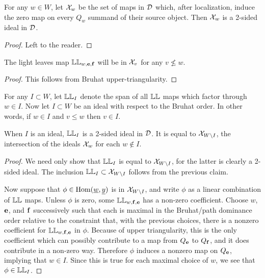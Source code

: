 \begin{claim} For any $w \in W$, let ${\mathcal{X}}_w$ be the set of maps in ${\mathcal{D}}$ which, after localization, induce the zero map on every $Q_w$ summand of their source object. Then ${\mathcal{X}}_w$ is a
2-sided ideal in ${\mathcal{D}}$. \end{claim}

\begin{proof} Left to the reader. \end{proof}

\begin{claim} The light leaves map $\mathbb{LL}_{w,{\mathbf e},{\mathbf f}}$ will be in ${\mathcal{X}}_v$ for any $v \nleq w$. \end{claim}

\begin{proof} This follows from Bruhat upper-triangularity. \end{proof}

For any $I \subset W$, let $\mathbb{LL}_I$ denote the span of all $\mathbb{LL}$ maps which factor through $w \in I$. Now let $I \subset W$ be an ideal with respect to the Bruhat order. In other words,
if $w \in I$ and $v \le w$ then $v \in I$.

\begin{claim} When $I$ is an ideal, $\mathbb{LL}_I$ is a 2-sided ideal in ${\mathcal{D}}$. It is equal to ${\mathcal{X}}_{W \setminus I}$, the intersection of the ideals ${\mathcal{X}}_w$ for each $w \notin I$. \end{claim}

\begin{proof} We need only show that $\mathbb{LL}_I$ is equal to ${\mathcal{X}}_{W \setminus I}$, for the latter is clearly a 2-sided ideal. The inclusion $\mathbb{LL}_I \subset {\mathcal{X}}_{W \setminus I}$ follows from
the previous claim.

Now suppose that $\phi \in \operatorname{Hom}({\underline{w}},{\underline{y}})$ is in ${\mathcal{X}}_{W \setminus I}$, and write $\phi$ as a linear combination of $\mathbb{LL}$ maps. Unless $\phi$ is zero, some $\mathbb{LL}_{w,{\mathbf f},{\mathbf e}}$ has a
non-zero coefficient. Choose $w$, ${\mathbf e}$, and ${\mathbf f}$ successively such that each is maximal in the Bruhat/path dominance order relative to the constraint that, with the previous choices,
there is a nonzero coefficient for $\mathbb{LL}_{w,{\mathbf f},{\mathbf e}}$ in $\phi$. Because of upper triangularity, this is the only coefficient which can possibly contribute to a map from $Q_{\mathbf e}$ to
$Q_{{\mathbf f}}$, and it does contribute in a non-zero way. Therefore $\phi$ induces a nonzero map on $Q_{\mathbf e}$, implying that $w \in I$. Since this is true for each maximal choice of $w$, we see
that $\phi \in \mathbb{LL}_I$. \end{proof}

